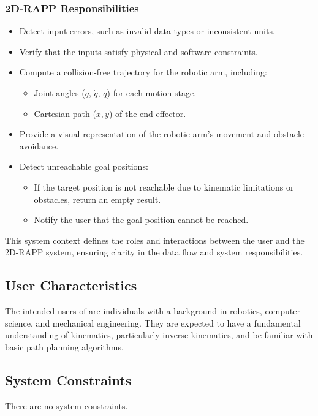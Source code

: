 \documentclass[12pt]{article}
\begin{document}
\subsubsection*{2D-RAPP Responsibilities}
\begin{itemize}
    \item Detect input errors, such as invalid data types or inconsistent units.
    \item Verify that the inputs satisfy physical and software constraints.
    \item Compute a collision-free trajectory for the robotic arm, including:
    \begin{itemize}
        \item Joint angles (\(q\), \(\dot{q}\), \(\ddot{q}\)) for each motion stage.
        \item Cartesian path (\(x, y\)) of the end-effector.
    \end{itemize}
    \item Provide a visual representation of the robotic arm's movement and obstacle avoidance.
    \item Detect unreachable goal positions:
    \begin{itemize}
        \item If the target position is not reachable due to kinematic limitations or obstacles, return an empty result.
        \item Notify the user that the goal position cannot be reached.
    \end{itemize}
\end{itemize}

This system context defines the roles and interactions between the user and the 2D-RAPP system, ensuring clarity in the data flow and system responsibilities.


\subsection{User Characteristics} \label{SecUserCharacteristics}
The intended users of \progname{} are individuals with a background in robotics, computer science, and mechanical engineering. They are expected to have a fundamental understanding of kinematics, particularly inverse kinematics, and be familiar with basic path planning algorithms. 


\subsection{System Constraints}
There are no system constraints.
\end{document}
